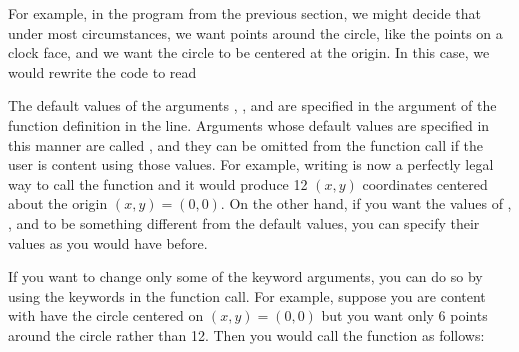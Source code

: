 \documentclass[letterpaper,10pt,english]{sphinxmanual}
\begin{document}
\sphinxAtStartPar
For example, in the program  from the previous section, we might decide that under most circumstances, we want  points around the circle, like the points on a clock face, and we want the circle to be centered at the origin.  In this case, we would rewrite the code to read

\begin{sphinxVerbatim}[commandchars=\\\{\},numbers=left,firstnumber=1,stepnumber=1]
    
         
        
        
      
\end{sphinxVerbatim}

\sphinxAtStartPar
The default values of the arguments , , and  are specified in the argument of the function definition in the  line.  Arguments whose default values are specified in this manner are called , and they can be omitted from the function call if the user is content using those values.  For example, writing  is now a perfectly legal way to call the  function and it would produce 12 \((x,y)\) coordinates centered about the origin \((x,y)=(0,0)\).  On the other hand, if you want the values of  , , and  to be something different from the default values, you can specify their values as you would have before.

\sphinxAtStartPar
If you want to change only some of the keyword arguments, you can do so by using the keywords in the function call.  For example, suppose you are content with have the circle centered on \((x,y)=(0,0)\) but you want only 6 points around the circle rather than 12.  Then you would call the  function as follows:
\end{document}
